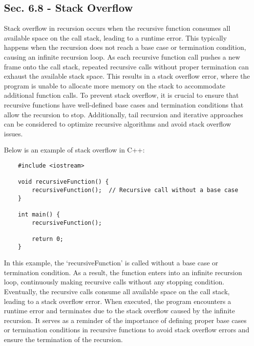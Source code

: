 \subsection*{Sec. 6.8 - Stack Overflow}

Stack overflow in recursion occurs when the recursive function consumes all available space on the call stack, leading to a runtime error. This typically happens when the recursion does not reach a base case or termination condition, causing an infinite recursion loop. As each recursive function call pushes a new frame onto the 
call stack, repeated recursive calls without proper termination can exhaust the available stack space. This results in a stack overflow error, where the program is unable to allocate more memory on the stack to accommodate additional function calls. To prevent stack overflow, it is crucial to ensure that recursive functions have 
well-defined base cases and termination conditions that allow the recursion to stop. Additionally, tail recursion and iterative approaches can be considered to optimize recursive algorithms and avoid stack overflow issues.

\begin{solution}
    Below is an example of stack overflow in C++:

    \horizontalline

    \begin{verbatim}
    #include <iostream>

    void recursiveFunction() {
        recursiveFunction();  // Recursive call without a base case
    }
    
    int main() {
        recursiveFunction();
    
        return 0;
    }
    \end{verbatim}

    \horizontalline

    In this example, the `recursiveFunction' is called without a base case or termination condition. As a result, the function enters into an infinite recursion loop, continuously making recursive calls without any stopping condition. Eventually, the recursive calls consume all available space on the call stack, leading to a stack 
    overflow error. When executed, the program encounters a runtime error and terminates due to the stack overflow caused by the infinite recursion. It serves as a reminder of the importance of defining proper base cases or termination conditions in recursive functions to avoid stack overflow errors and ensure the termination of the recursion.
\end{solution}

